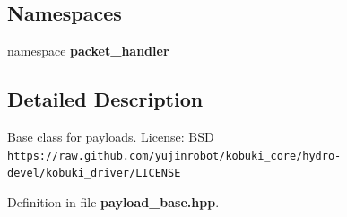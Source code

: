 \subsection*{\-Namespaces}
\begin{DoxyCompactItemize}
\item 
namespace {\bf packet\-\_\-handler}
\end{DoxyCompactItemize}


\subsection{\-Detailed \-Description}
\-Base class for payloads. \-License\-: \-B\-S\-D {\tt https\-://raw.\-github.\-com/yujinrobot/kobuki\-\_\-core/hydro-\/devel/kobuki\-\_\-driver/\-L\-I\-C\-E\-N\-S\-E} 

\-Definition in file {\bf payload\-\_\-base.\-hpp}.

